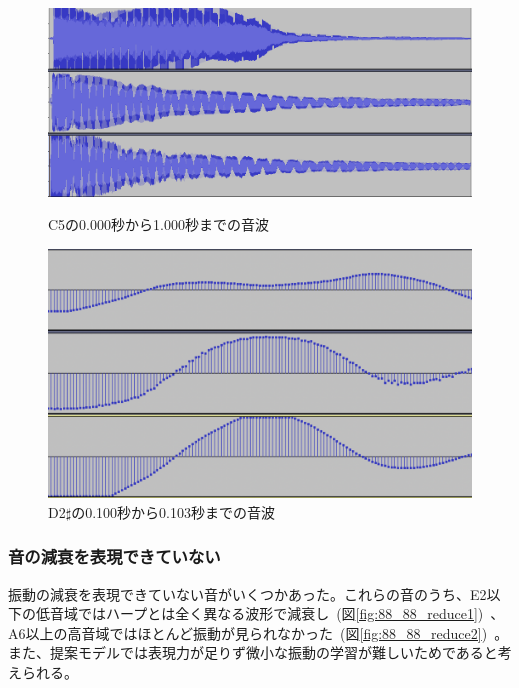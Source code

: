 \begin{figure}[b]
\begin{center}
\begin{minipage}{0.48\hsize}
\begin{center}
\includegraphics[width=0.85\hsize]{figure/88_88/c5.png}
\caption{C5の0.000秒から1.000秒までの音波}
\label{fig:88_88_amp}
\end{center}
\end{minipage}
\begin{minipage}{0.48\hsize}
\begin{center}
\includegraphics[width=0.75\hsize]{figure/88_88_det/d2s_0100_0103.png}
\caption{D2$\sharp$の0.100秒から0.103秒までの音波}
\label{fig:88_88_smooth}
\end{center}
\end{minipage}
\end{center}
\end{figure}

\subsubsection{音の減衰を表現できていない}

振動の減衰を表現できていない音がいくつかあった。これらの音のうち、E2以下の低音域ではハープとは全く異なる波形で減衰し~(図\ref{fig:88_88_reduce1})~、A6以上の高音域ではほとんど振動が見られなかった~(図\ref{fig:88_88_reduce2})~。また、提案モデルでは表現力が足りず微小な振動の学習が難しいためであると考えられる。

